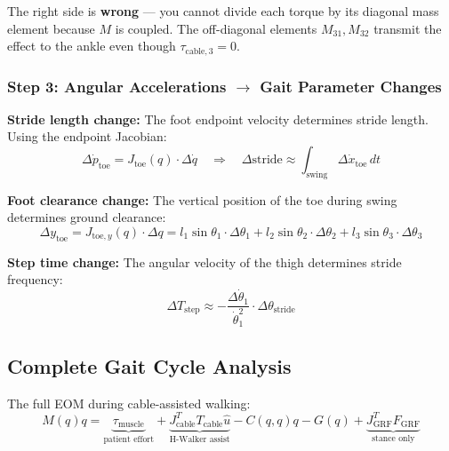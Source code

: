 \documentclass[11pt,a4paper]{article}
\newcommand{\vc}[1]{\bm{#1}}
\newcommand{\mat}[1]{\bm{#1}}
\newcommand{\dt}[1]{\dot{#1}}
\newcommand{\ddt}[1]{\ddot{#1}}
\def\vc#1{#1}%
\def\mat#1{#1}%
\def\dt#1{#1}%
\def\ddt#1{#1}%
\def\bm#1{#1}%
\begin{document}
The right side is \textbf{wrong} --- you cannot divide each torque by its
diagonal mass element because $\mat{M}$ is coupled. The off-diagonal
elements $M_{31}, M_{32}$ transmit the effect to the ankle even though
$\tau_{\text{cable},3} = 0$.

\subsubsection*{Step 3: Angular Accelerations $\to$ Gait Parameter Changes}

\textbf{Stride length change:}
The foot endpoint velocity determines stride length. Using the endpoint Jacobian:
\begin{equation}
    \Delta \dot{\vc{p}}_{\text{toe}} = \vc{J}_{\text{toe}}(\vc{q}) \cdot \Delta\dot{\vc{q}}
    \quad \Rightarrow \quad
    \Delta\text{stride} \approx \int_{\text{swing}} \Delta \dot{x}_{\text{toe}} \, dt
    \label{eq:stride_change}
\end{equation}

\textbf{Foot clearance change:}
The vertical position of the toe during swing determines ground clearance:
\begin{equation}
    \Delta y_{\text{toe}} = \vc{J}_{\text{toe},y}(\vc{q}) \cdot \Delta\vc{q}
    = l_1 \sin\theta_1 \cdot \Delta\theta_1 + l_2 \sin\theta_2 \cdot \Delta\theta_2 + l_3 \sin\theta_3 \cdot \Delta\theta_3
    \label{eq:clearance_change}
\end{equation}

\textbf{Step time change:}
The angular velocity of the thigh determines stride frequency:
\begin{equation}
    \Delta T_{\text{step}} \approx -\frac{\Delta\dot{\theta}_1}{\dot{\theta}_1^2} \cdot \Delta\theta_{\text{stride}}
    \label{eq:step_time_change}
\end{equation}

\subsection{Complete Gait Cycle Analysis}

The full EOM during cable-assisted walking:
\begin{equation}
\boxed{
    \mat{M}(\vc{q})\ddt{\vc{q}} = \underbrace{\vc{\tau}_{\text{muscle}}}_{\text{patient effort}}
    + \underbrace{\vc{J}_{\text{cable}}^T T_{\text{cable}}  \hat{\vc{u}}}_{\text{H-Walker assist}}
    - \vc{C}(\vc{q},\dt{\vc{q}})\dt{\vc{q}} - \vc{G}(\vc{q})
    + \underbrace{\vc{J}_{\text{GRF}}^T \vc{F}_{\text{GRF}}}_{\text{stance only}}
}
\label{eq:full_gait_eom}
\end{equation}
\end{document}
